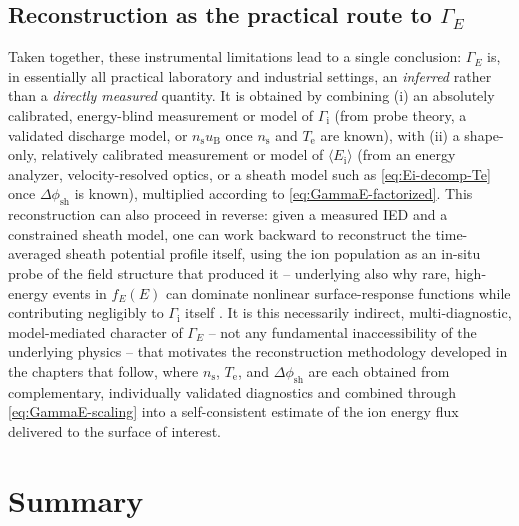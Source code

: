 \subsection{Reconstruction as the practical route to \texorpdfstring{$\Gamma_{E}$}{Gamma\_E}}

Taken together, these instrumental limitations lead to a single conclusion: $\Gamma_{E}$ is, in essentially all practical laboratory and industrial settings, an \emph{inferred} rather than a \emph{directly measured} quantity. It is obtained by combining (i) an absolutely calibrated, energy-blind measurement or model of $\Gamma_{\mathrm{i}}$ (from probe theory, a validated discharge model, or $n_{\mathrm{s}} u_{\mathrm{B}}$ once $n_{\mathrm{s}}$ and $T_{\mathrm{e}}$ are known), with (ii) a shape-only, relatively calibrated measurement or model of $\langle E_{\mathrm{i}}\rangle$ (from an energy analyzer, velocity-resolved optics, or a sheath model such as \cref{eq:Ei-decomp-Te} once $\Delta\phi_{\mathrm{sh}}$ is known), multiplied according to \cref{eq:GammaE-factorized}. This reconstruction can also proceed in reverse: given a measured IED and a constrained sheath model, one can work backward to reconstruct the time-averaged sheath potential profile itself, using the ion population as an in-situ probe of the field structure that produced it -- underlying also why rare, high-energy events in $f_E(E)$ can dominate nonlinear surface-response functions while contributing negligibly to $\Gamma_{\mathrm{i}}$ itself \cite{ref0096}. It is this necessarily indirect, multi-diagnostic, model-mediated character of $\Gamma_{E}$ -- not any fundamental inaccessibility of the underlying physics -- that motivates the reconstruction methodology developed in the chapters that follow, where $n_{\mathrm{s}}$, $T_{\mathrm{e}}$, and $\Delta\phi_{\mathrm{sh}}$ are each obtained from complementary, individually validated diagnostics and combined through \cref{eq:GammaE-scaling} into a self-consistent estimate of the ion energy flux delivered to the surface of interest.

\section{Summary}

